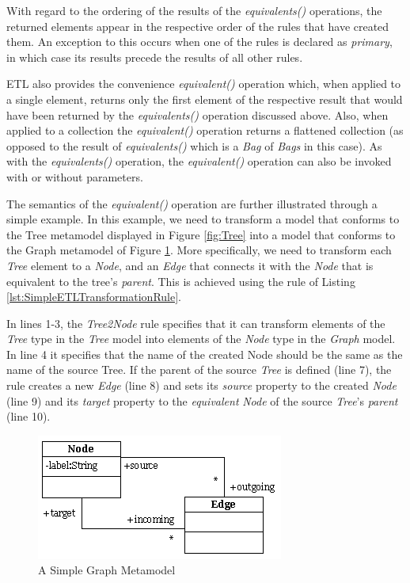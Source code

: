 With regard to the ordering of the results of the \emph{equivalents()} operations, the returned elements appear in the respective order of the rules that have created them. An exception to this occurs when one of the rules is declared as \emph{primary}, in which case its results precede the results of all other rules.

ETL also provides the convenience \emph{equivalent()} operation which, when applied to a single element, returns only the first element of the respective result that would have been returned by the \emph{equivalents()} operation discussed above. Also, when applied to a collection the \emph{equivalent()} operation returns a flattened collection (as opposed to the result of \emph{equivalents()} which is a \emph{Bag} of \emph{Bags} in this case). As with the \emph{equivalents()} operation, the \emph{equivalent()} operation can also be invoked with or without parameters.

The semantics of the \emph{equivalent()} operation are further illustrated through a simple example. In this example, we need to transform a model that conforms to the Tree metamodel displayed in Figure \ref{fig:Tree} into a model that conforms to the Graph metamodel of Figure \ref{fig:Graph}. More specifically, we need to transform each \emph{Tree} element to a \emph{Node}, and an \emph{Edge} that connects it with the \emph{Node} that is equivalent to the tree's \emph{parent}. This is achieved using the rule of Listing \ref{lst:SimpleETLTransformationRule}. 

In lines 1-3, the \emph{Tree2Node} rule specifies that it can transform elements of the \emph{Tree} type in the \emph{Tree} model into elements of the \emph{Node} type in the \emph{Graph} model. In line 4 it specifies that the name of the created Node should be the same as the name of the source Tree. If the parent of the source \emph{Tree} is defined (line 7), the rule creates a new \emph{Edge} (line 8) and sets its \emph{source} property to the created \emph{Node} (line 9) and its \emph{target} property to the \emph{equivalent} \emph{Node} of the source \emph{Tree}'s \emph{parent} (line 10).

\begin{figure}
	\centering
		\includegraphics{images/Graph.png}
	\caption{A Simple Graph Metamodel}
	\label{fig:Graph}
\end{figure}

